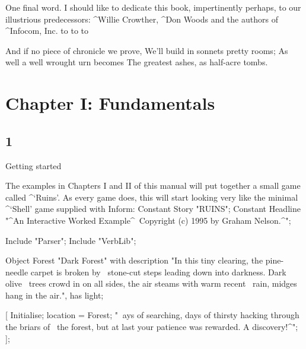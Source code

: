 One final word.  I should like to dedicate this book, impertinently perhaps,
to our illustrious predecessors: ^{Willie Crowther}, ^{Don Woods} and
the authors of ^{Infocom, Inc.}
\medskip
\hbox to
\hbox to
\hbox to
\bigskip\medskip

\poem
And if no piece of chronicle we prove,
We'll build in sonnets pretty rooms;
As well a well wrought urn becomes
The greatest ashes, as half-acre tombs.

\newpage

\chapter{Chapter I: Fundamentals}

\section{1}{Getting started}

\noindent
The examples in Chapters I and II of this manual will put together
a small game called ^{`Ruins'}.  As every game does, this will start
looking very like the minimal ^{`Shell'} game supplied with Inform:
\beginstt
Constant Story "RUINS";
Constant Headline "^An Interactive Worked Example^\
             Copyright (c) 1995 by Graham Nelson.^";

Include "Parser";
Include "VerbLib";

Object Forest "Dark Forest"
  with description
          "In this tiny clearing, the pine-needle carpet is broken by \
           stone-cut steps leading down into darkness.  Dark olive \
           trees crowd in on all sides, the air steams with warm recent \
           rain, midges hang in the air.",
  has  light;

[ Initialise;
  location = Forest;
 "^^^^^Days of searching, days of thirsty hacking through the briars of \
  the forest, but at last your patience was rewarded. A discovery!^";
];

